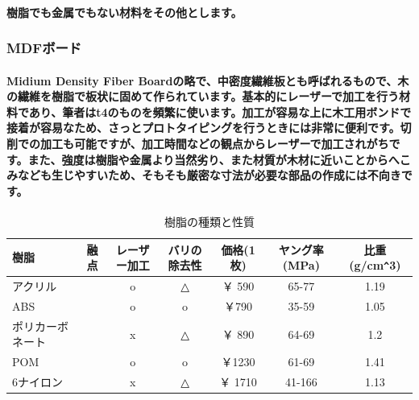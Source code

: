 \documentclass[b5paper, 9pt, twocolumn, titlepage,openany]{jsbook}%
\begin{document}
\paragraph{樹脂でも金属でもない材料をその他とします。}

\subsubsection{MDFボード}

\paragraph{Midium Density Fiber Boardの略で、中密度繊維板とも呼ばれるもので、木の繊維を樹脂で板状に固めて作られています。基本的にレーザーで加工を行う材料であり、筆者はt4のものを頻繁に使います。加工が容易な上に木工用ボンドで接着が容易なため、さっとプロトタイピングを行うときには非常に便利です。切削での加工も可能ですが、加工時間などの観点からレーザーで加工されがちです。また、強度は樹脂や金属より当然劣り、また材質が木材に近いことからへこみなども生じやすいため、そもそも厳密な寸法が必要な部品の作成には不向きです。}

\newpage
\begin{table}[htb]
  \begin{center}
    \caption{樹脂の種類と性質}
    \begin{tabular}{|l|c|c|c|c|c|c|} \hline
      樹脂 & 融点 & レーザー加工 & バリの除去性  & 価格(1枚) & ヤング率(MPa) & 比重(g/cm\verb|^|3)\\ \hline
      アクリル        & & o & △  &￥ 590   &65-77  & 1.19 \\ \hline
      ABS             & & o & o  & ￥790  & 35-59  & 1.05\\ \hline
      ポリカーボネート& & x & △  &￥ 890   &64-69  & 1.2 \\ \hline
      POM             & & o & o  & ￥1230 & 61-69  & 1.41\\ \hline
      6ナイロン       & & x & △  &￥ 1710  &41-166  &1.13 \\ \hline
    \end{tabular}
    \label{plastic_table}
  \end{center}
\end{table}
\end{document}
